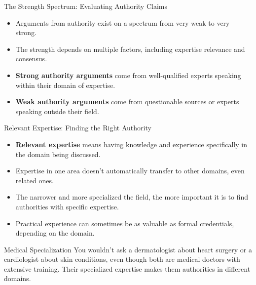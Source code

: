 \documentclass{beamer}
\begin{document}
\begin{frame}{The Strength Spectrum: Evaluating Authority Claims}
    \begin{itemize}
        \item Arguments from authority exist on a spectrum from very weak to very strong.
        \item The strength depends on multiple factors, including expertise relevance and consensus.
        \item \textbf{Strong authority arguments} come from well-qualified experts speaking within their domain of expertise.
        \item \textbf{Weak authority arguments} come from questionable sources or experts speaking outside their field.
    \end{itemize}
    
\end{frame}

\begin{frame}{Relevant Expertise: Finding the Right Authority}
    \begin{itemize}
        \item \textbf{Relevant expertise} means having knowledge and experience specifically in the domain being discussed.
        \item Expertise in one area doesn't automatically transfer to other domains, even related ones.
        \item The narrower and more specialized the field, the more important it is to find authorities with specific expertise.
        \item Practical experience can sometimes be as valuable as formal credentials, depending on the domain.
    \end{itemize}
    
    \begin{example}{Medical Specialization}
        You wouldn't ask a dermatologist about heart surgery or a cardiologist about skin conditions, even though both are medical doctors with extensive training. Their specialized expertise makes them authorities in different domains.
    \end{example}
\end{frame}
\end{document}
